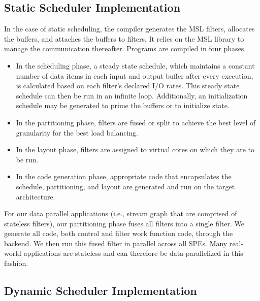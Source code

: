 \subsection{Static Scheduler Implementation}
In the case of static scheduling, the compiler generates the MSL
filters, allocates the buffers, and attaches the buffers to
filters. It relies on the MSL library to manage the communication
thereafter. Programs are compiled in four phases.
\begin{itemize}
\item In the scheduling phase, a steady state schedule, which
maintains a constant number of data items in each input and output
buffer after every execution, is calculated based on each filter's
declared I/O rates. This steady state schedule can then be run in an
infinite loop. Additionally, an initialization schedule may be
generated to prime the buffers or to initialize state.
\item In the partitioning phase, filters are fused or split to achieve
the best level of granularity for the best load balancing.
\item In the layout phase, filters are assigned to virtual cores on
which they are to be run.
\item In the code generation phase, appropriate code that encapsulates
the schedule, partitioning, and layout are generated and run on the
target architecture.
\end{itemize}

For our data parallel applications (i.e., stream graph that are
comprised of stateless filters), our partitioning phase fuses all
filters into a single filter. We generate all code, both control and
filter work function code, through the backend. We then run this fused
filter in parallel across all SPEs. Many real-world applications are
stateless and can therefore be data-parallelized in this fashion.



\subsection{Dynamic Scheduler Implementation}\label{ch:ds:imp}

